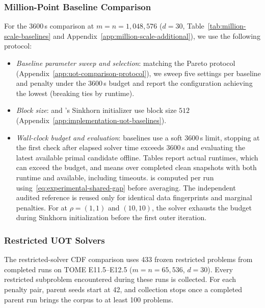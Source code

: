 \subsubsection{Million-Point Baseline Comparison}
\label{app:million-baseline-protocol}
For the $3600$\,s comparison at $m=n=1{,}048{,}576$ ($d=30$, Table~\ref{tab:million-scale-baselines} and Appendix~\ref{app:million-scale-additional}), we use the following protocol:
\begin{itemize}
\item \emph{Baseline parameter sweep and selection}: matching the Pareto protocol (Appendix~\ref{app:uot-comparison-protocol}), we sweep five settings per baseline and penalty under the $3600$\,s budget and report the configuration achieving the lowest \sharedgap (breaking ties by runtime).
\item \emph{Block size}: \sinkhornonline and \hellouot's Sinkhorn initializer use block size $512$ (Appendix~\ref{app:implementation-uot-baselines}).
\item \emph{Wall-clock budget and evaluation}: baselines use a soft $3600$\,s limit, stopping at the first check after elapsed solver time exceeds $3600$\,s and evaluating the latest available primal candidate offline.
Tables report actual runtimes, which can exceed the budget, and means over completed clean snapshots with both runtime and \sharedgap available, including timeouts.
\sharedgap is computed per run using~\eqref{eq:experimental-shared-gap} before averaging.
The independent audited reference is reused only for identical data fingerprints and marginal penalties.
For \hellouot at $\rho=(1,1)$ and $(10,10)$, the solver exhausts the budget during Sinkhorn initialization before the first outer iteration.
\end{itemize}

\subsubsection{Restricted UOT Solvers}
\label{app:restricted-experiment-protocol}
The restricted-solver CDF comparison uses 433 frozen restricted problems from completed \ours runs on TOME E11.5--E12.5 ($m=n=65{,}536$, $d=30$).
Every restricted subproblem encountered during these runs is collected.
For each penalty pair, parent seeds start at 42, and collection stops once a completed parent run brings the corpus to at least 100 problems.

